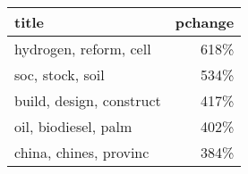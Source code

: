 \begin{tabular}{lr}
\toprule
                    title &  pchange \\
\midrule
   hydrogen, reform, cell &     618\% \\
         soc, stock, soil &     534\% \\
 build, design, construct &     417\% \\
     oil, biodiesel, palm &     402\% \\
   china, chines, provinc &     384\% \\
\bottomrule
\end{tabular}
